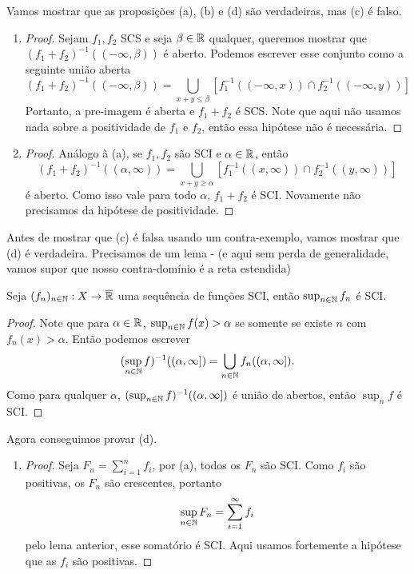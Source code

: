 Vamos mostrar que as proposições (a), (b) e (d) são verdadeiras, mas (c) é falso.
\begin{enumerate}[label=(\alph*)]
    \item \begin{proof}
        Sejam $f_1, f_2$ SCS e seja $\beta \in \mathbb{R}$ qualquer, queremos mostrar que $(f_1 + f_2)^{-1}((-\infty, \beta))$ é aberto.
        Podemos escrever esse conjunto como a seguinte união aberta
        $$(f_1 + f_2)^{-1}((-\infty, \beta)) = \bigcup_{x + y \leq \beta} [f_1^{-1}((-\infty, x)) \cap f_2^{-1}((-\infty, y))] $$
        Portanto, a pre-imagem é aberta e $f_1+ f_2$ é SCS. Note que aqui não usamos nada sobre a positividade de $f_1$ e $f_2$, então essa hipótese não é necessária.
    \end{proof}
    \item \begin{proof}
        Análogo à (a), se $f_1,f_2$ são SCI e $\alpha \in \mathbb{R}$, então 
        $$(f_1 + f_2)^{-1}((\alpha, \infty)) = \bigcup_{x + y \geq \alpha} [f_1^{-1}((x,\infty)) \cap f_2^{-1}((y,\infty))]$$
        é aberto. Como isso vale para todo $\alpha$, $f_1 + f_2$ é SCI. Novamente não precisamos da hipótese de positividade.
    \end{proof}
\end{enumerate}
Antes de mostrar que (c) é falsa usando um contra-exemplo, vamos mostrar que (d) é verdadeira. Precisamos de um lema - (e aqui sem perda de generalidade, 
vamos supor que nosso contra-domínio é a reta estendida)
\begin{lemma}
    Seja $(f_n)_{n \in \mathbb{N}}: X \rightarrow \overline{\mathbb{R}}$ uma sequência de funções SCI, então $\sup_{n \in \mathbb{N}} f_n$ é SCI.
\end{lemma}
\begin{proof}
    Note que para $\alpha \in \mathbb{R}$, $\sup_{n \in \mathbb{N}} f (x) > \alpha$ se somente se existe $n$ com $f_n(x) > \alpha$. Então podemos escrever
    $$(\sup_{n \in \mathbb{N}} f)^{-1}((\alpha, \infty]) = \bigcup_{n \in \mathbb{N}} f_n((\alpha, \infty]).$$
    Como para qualquer $\alpha$, $(\sup_{n \in \mathbb{N}} f)^{-1}((\alpha, \infty])$ é união de abertos, então $\sup_n f$ é SCI.
\end{proof}
Agora conseguimos provar (d).
\begin{enumerate}[label=(\alph*)]
    \addtocounter{enumi}{3}
    \item \begin{proof}
        Seja $F_n = \sum_{i=1}^{n} f_i$, por (a), todos os $F_n$ são SCI. Como $f_i$ são positivas, os $F_n$ são crescentes, portanto
        $$\sup_{n \in \mathbb{N}} F_n = \sum_{i=1}^{\infty} f_i$$
        pelo lema anterior, esse somatório é SCI. Aqui usamos fortemente a hipótese que as $f_i$ são positivas.
    \end{proof}
\end{enumerate}
